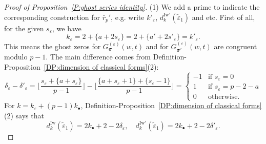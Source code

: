 \documentclass[12pt]{amsart}
\theoremstyle{definition}
\numberwithin{equation}{subsection}
\newcommand{\bbsigma}{\boldsymbol{\sigma}}
\newcommand{\Iw}{\mathrm{Iw}}
\begin{document}
\begin{proof}[Proof of Proposition~\ref{P:ghost series identity}]
(1) We add a prime to indicate the corresponding construction for $\bar r_p'$, e.g. write $k'_\varepsilon$, $d^{\Iw'}_k(\tilde \varepsilon_1)$ and etc.
First of all, for the given $s_\varepsilon$, we have $$k_\varepsilon = 2+\{a+2s_\varepsilon\} = 2+\{a'+2s'_\varepsilon\} = k'_\varepsilon.$$
This means the ghost zeros for $G_{\bbsigma}^{(\varepsilon)} (w, t)$ and for $G_{\bbsigma'}^{(\varepsilon)} (w, t)$ are congruent modulo $p-1$.
The main difference comes from Definition-Proposition~\ref{DP:dimension of classical forms}(2):
$$
\delta_\varepsilon - \delta'_\varepsilon = \Big\lfloor \frac{s_\varepsilon + \{a+s_\varepsilon\}}{p-1}\Big \rfloor - \Big\lfloor \frac{\{a+s_\varepsilon +1\} + \{s_\varepsilon-1\}}{p-1}\Big \rfloor
=\begin{cases}
-1& \textrm{if }s_\varepsilon = 0\\
1& \textrm{if }s_\varepsilon = p-2-a\\
0 & \textrm{otherwise.}
\end{cases}
$$
For $k = k_\varepsilon +(p-1)k_\bullet$, Definition-Proposition~\ref{DP:dimension of classical forms}(2) says that
\begin{equation}
\label{E:dim of dkIw}
d_k^{\Iw}(\tilde \varepsilon_1) = 2k_\bullet+2-2\delta_\varepsilon, \quad d_k^{\Iw\prime}(\tilde \varepsilon_1) = 2k_\bullet+2-2\delta'_\varepsilon.
\end{equation}


\end{proof}
\end{document}
